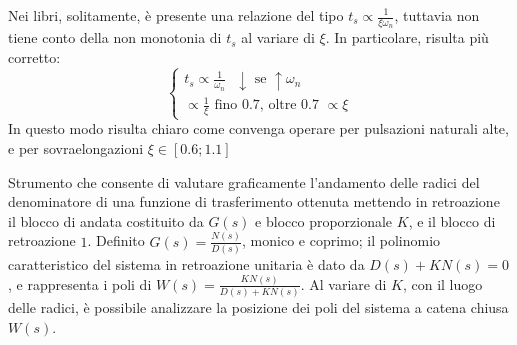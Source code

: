 Nei libri, solitamente, è presente una relazione del tipo \(t_s \propto \frac{1}{\xi \omega_n} \), tuttavia non tiene conto della non monotonia di \(t_s\) al variare di \(\xi\).
In particolare, risulta più corretto:
\[
\begin{cases}
    t_s \propto \frac{1}{\omega_n} \text{ \ } \downarrow \text{\ se \ } \uparrow \omega_n \\
    \propto \frac{1}{\xi} \text{\ fino 0.7, oltre 0.7 \ } \propto \xi
\end{cases}
\]
In questo modo risulta chiaro come convenga operare per pulsazioni naturali alte, e per sovraelongazioni \(\xi \in [0.6;1.1]\) {\color{red}{Come mai in questo range, cosa significa?}}

\label{rlocus}
Strumento che consente di valutare graficamente l'andamento delle radici del denominatore di una funzione di trasferimento ottenuta mettendo in retroazione il blocco di andata costituito da $G(s)$ e blocco proporzionale $K$, e il blocco di retroazione $1$. 
Definito $G(s)=\frac{N(s)}{D(s)}$, monico e coprimo; il polinomio caratteristico del sistema in retroazione unitaria è dato da $D(s) + K N(s) = 0$, e rappresenta i poli di $W(s)=\frac{K N(s)}{D(s) + K N(s)}$. Al variare di $K$, con il luogo delle radici, è possibile analizzare la posizione dei poli del sistema a catena chiusa $W(s)$.

